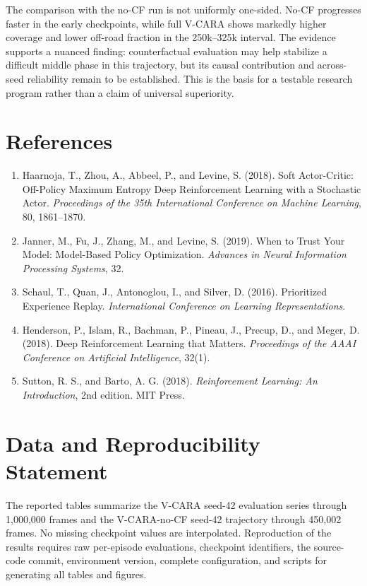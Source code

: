 \documentclass[11pt]{article}
\providecommand{\tightlist}{\setlength{\itemsep}{0pt}\setlength{\parskip}{0pt}}
\begin{document}
The comparison with the no-CF run is not uniformly one-sided. No-CF
progresses faster in the early checkpoints, while full V-CARA shows
markedly higher coverage and lower off-road fraction in the 250k--325k
interval. The evidence supports a nuanced finding: counterfactual
evaluation may help stabilize a difficult middle phase in this
trajectory, but its causal contribution and across-seed reliability
remain to be established. This is the basis for a testable research
program rather than a claim of universal superiority.

\section{References}\label{references}

\begin{enumerate}
\def\labelenumi{\arabic{enumi}.}
\tightlist
\item
  Haarnoja, T., Zhou, A., Abbeel, P., and Levine, S. (2018). Soft
  Actor-Critic: Off-Policy Maximum Entropy Deep Reinforcement Learning
  with a Stochastic Actor. \emph{Proceedings of the 35th International
  Conference on Machine Learning}, 80, 1861--1870.
\item
  Janner, M., Fu, J., Zhang, M., and Levine, S. (2019). When to Trust
  Your Model: Model-Based Policy Optimization. \emph{Advances in Neural
  Information Processing Systems}, 32.
\item
  Schaul, T., Quan, J., Antonoglou, I., and Silver, D. (2016).
  Prioritized Experience Replay. \emph{International Conference on
  Learning Representations}.
\item
  Henderson, P., Islam, R., Bachman, P., Pineau, J., Precup, D., and
  Meger, D. (2018). Deep Reinforcement Learning that Matters.
  \emph{Proceedings of the AAAI Conference on Artificial Intelligence},
  32(1).
\item
  Sutton, R. S., and Barto, A. G. (2018). \emph{Reinforcement Learning:
  An Introduction}, 2nd edition. MIT Press.
\end{enumerate}

\section{Data and Reproducibility
Statement}\label{data-and-reproducibility-statement}

The reported tables summarize the V-CARA seed-42 evaluation series through
1,000,000 frames and the V-CARA-no-CF seed-42 trajectory through 450,002
frames. No missing checkpoint values are interpolated. Reproduction of the
results requires raw per-episode evaluations, checkpoint identifiers, the
source-code commit, environment version, complete configuration, and scripts
for generating all tables and figures.
\end{document}
